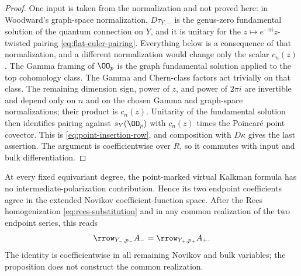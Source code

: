 \begin{proof}
One input is taken from the normalization and not proved here: in Woodward's
graph-space normalization, \(D\tau_{Y,-}\) is the genus-zero fundamental
solution of the quantum connection on \(Y\), and it is unitary for the
\(z\mapsto e^{-\pi i}z\)-twisted pairing \eqref{eq:flat-euler-pairing}.
Everything below is a consequence of that normalization, and a different
normalization would change only the scalar \(c_n(z)\).
The Gamma framing of \(\OO_p\) is the graph fundamental solution applied to
the top cohomology class.  The Gamma and Chern-class factors act trivially on
that class.  The remaining dimension sign, power of \(z\), and power of
\(2\pi i\) are invertible and depend only on \(n\) and on the chosen Gamma and
graph-space normalizations; their product is \(c_n(z)\).  Unitarity of the
fundamental solution then identifies pairing against \(s_Y(\OO_p)\) with
\(c_n(z)\) times the Poincar\'e point covector.  This is
\eqref{eq:point-insertion-row}, and composition with \(D\kappa\)
gives the last assertion.  The argument is coefficientwise over \(R\), so it
commutes with input and bulk differentiation.
\end{proof}

\begin{proposition}
\label{prop:support-collapse}
At every fixed equivariant degree, the point-marked virtual Kalkman formula
has no intermediate-polarization contribution.  Hence its two endpoint
coefficients agree in the extended Novikov coefficient-function space.
After the Rees homogenization \eqref{eq:rees-substitution} and in any common
realization of the two endpoint series, this reads
\begin{equation}\label{eq:support-collapse-row}
 \rrow_{Y_-,p_-}A_- =\rrow_{Y_+,p_+}A_+.
\end{equation}
The identity is coefficientwise in all remaining Novikov and bulk
variables; the proposition does not construct the common realization.
\end{proposition}

